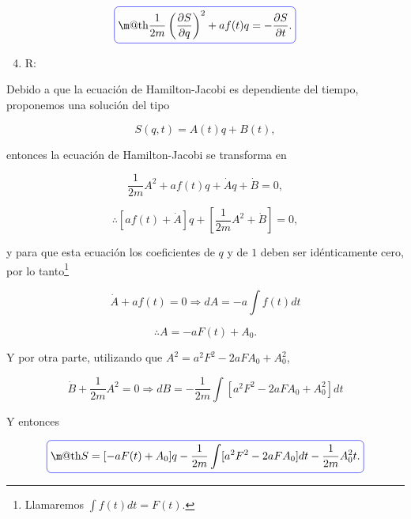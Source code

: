 \documentclass[a4paper,10pt]{article}
\makeatletter
\numberwithin{equation}{section}
\newcommand*{\boxcolor}{blue}
\renewcommand{\boxed}[1]{\textcolor{\boxcolor}{%
\tikz[baseline={([yshift=-1ex]current bounding box.center)}] \node [rectangle, minimum width=1ex,rounded corners,draw] {\normalcolor\m@th$\displaystyle#1$};}}
\makeatother
\begin{document}
\begin{equation}
 \boxed{\frac{1}{2m}\left(\frac{\partial S}{\partial q}\right)^2 + af(t)q = 
 - \frac{\partial S}{\partial t}.}
\end{equation}

\begin{enumerate}[label=\alph*)]
\setcounter{enumi}{3}
 \item R:
\end{enumerate}

Debido a que la ecuación de Hamilton-Jacobi es dependiente del tiempo, proponemos 
una solución del tipo 

\begin{equation}
 S(q,t) = A(t)q + B(t),
\end{equation}

entonces la ecuación de Hamilton-Jacobi se transforma en

\begin{equation}
\frac{1}{2m} A^2 + af(t)q + \dot{A}q + \dot{B} = 0,
\end{equation}

\begin{equation}
 \therefore [af(t) + \dot{A}]q + \left[\frac{1}{2m}A^2 + \dot{B} \right] = 0,
\end{equation}

y para que esta ecuación los coeficientes de $q$ y de $1$ deben ser idénticamente 
cero, por lo tanto\footnote{Llamaremos $\int f(t) dt = F(t)$.}

\begin{equation}
 \dot{A} + af(t) = 0 \Rightarrow dA = - a\int f(t)dt
\end{equation}

\begin{equation}
 \therefore A = -aF(t) + A_0.
\end{equation}

Y por otra parte, utilizando que $A^2 = a^2F^2 - 2aFA_0 + A_0^2$, 

\begin{equation}
 \dot{B} + \frac{1}{2m}A^2 = 0 \Rightarrow dB = 
 - \frac{1}{2m} \int [a^2F^2 - 2aFA_0 + A_0^2] dt
\end{equation}

Y entonces 

\begin{equation}
 \boxed{S = [-aF(t) + A_0]q  - \frac{1}{2m} \int [a^2F^2 - 2aFA_0] dt - \frac{1}{2m}A_0^2t.}
\end{equation}
\end{document}
